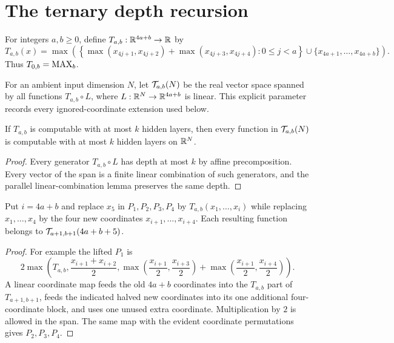 \section{The ternary depth recursion}

\begin{definition}
  \label{def:t-function}
  For integers $a,b\geq0$, define $T_{a,b}:\mathbb{R}^{4a+b}\to\mathbb{R}$ by
  \[
  T_{a,b}(x)=\max\left(
    \left\{\max(x_{4j+1},x_{4j+2})+
             \max(x_{4j+3},x_{4j+4}):0\leq j<a\right\}
    \cup\{x_{4a+1},\ldots,x_{4a+b}\}\right).
  \]
  Thus $T_{0,b}=\operatorname{MAX}_b$.
\end{definition}

\begin{definition}
  \label{def:t-space}
  For an ambient input dimension $N$, let $\mathcal{T}_{a,b}(N)$ be the real
  vector space spanned by all functions $T_{a,b}\circ L$, where
  $L:\mathbb{R}^N\to\mathbb{R}^{4a+b}$ is linear.  This explicit parameter records every
  ignored-coordinate extension used below.
\end{definition}

\begin{lemma}
  \label{lem:t-space-depth-transfer}
  If $T_{a,b}$ is computable with at most $k$ hidden layers, then every
  function in $\mathcal{T}_{a,b}(N)$ is computable with at most $k$ hidden layers
  on $\mathbb{R}^N$.
\end{lemma}
\begin{proof}
  Every generator $T_{a,b}\circ L$ has depth at most $k$ by affine
  precomposition.  Every vector of the span is a finite linear combination of
  such generators, and the parallel linear-combination lemma preserves the
  same depth.
\end{proof}

\begin{lemma}
  \label{lem:claim-five-p-membership}
  Put $i=4a+b$ and replace $x_5$ in $P_1,P_2,P_3,P_4$ by
  $T_{a,b}(x_1,\ldots,x_i)$ while replacing $x_1,\ldots,x_4$ by the four new
  coordinates $x_{i+1},\ldots,x_{i+4}$.  Each resulting function belongs to
  $\mathcal{T}_{a+1,b+1}(4a+b+5)$.
\end{lemma}
\begin{proof}
  For example the lifted $P_1$ is
  \[
  2\max\left(T_{a,b},\frac{x_{i+1}+x_{i+2}}2,
       \max\!\left(\frac{x_{i+1}}2,\frac{x_{i+3}}2\right)+
       \max\!\left(\frac{x_{i+1}}2,\frac{x_{i+4}}2\right)\right).
  \]
  A linear coordinate map feeds the old $4a+b$ coordinates into the
  $T_{a,b}$ part of $T_{a+1,b+1}$, feeds the indicated halved new coordinates
  into its one additional four-coordinate block, and uses one unused extra
  coordinate.  Multiplication by $2$ is allowed in the span.  The same map
  with the evident coordinate permutations gives $P_2,P_3,P_4$.
\end{proof}

